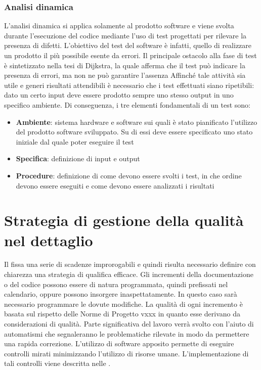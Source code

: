 \subsubsection{Analisi dinamica}

L'analisi dinamica si applica solamente al prodotto software e viene
svolta durante l'esecuzione del codice mediante l'uso di test
progettati per rilevare la presenza di difetti.
L'obiettivo del test del software è infatti, quello di
realizzare un prodotto il più possibile esente da errori. Il
principale ostacolo alla fase di test è sintetizzato nella tesi di
Dijkstra, la quale afferma che il test può indicare la presenza di
errori, ma non ne può garantire l'assenza
Affinché tale attività sia utile e generi risultati attendibili è
necessario che i test effettuati siano ripetibili: dato un certo input
deve essere prodotto sempre uno stesso output in uno specifico
ambiente. Di conseguenza, i tre elementi fondamentali di un test sono:

\begin{itemize}
\item \textbf{Ambiente}: sistema hardware e software sui quali è stato
  pianificato l'utilizzo del prodotto software sviluppato. Su di essi
  deve essere specificato uno stato iniziale dal quale poter eseguire
  il test

\item \textbf{Specifica}: definizione di input e output
\item \textbf{Procedure}: definizione di come devono essere svolti i
  test, in che ordine devono essere eseguiti e come devono essere
  analizzati i risultati
\end{itemize}




\section[Visione di dettaglio della qualità]{Strategia di gestione
  della qualità nel dettaglio}

Il \pianodiprogetto fissa una serie di scadenze improrogabili e quindi risulta necessario definire
con chiarezza una strategia di qualifica efficace. Gli incrementi della documentazione o del codice
possono essere di natura programmata, quindi prefissati nel calendario, oppure possono insorgere
inaspettatamente. In questo caso sarà necessario programmare le dovute
modifiche.
La qualità di ogni incremento è basata sul rispetto delle Norme di
Progetto vxxx in quanto esse derivano da considerazioni di qualità.
Parte significativa del lavoro
verrà svolto con l'aiuto di automatismi che segnaleranno le problematiche rilevate in modo da
permettere una rapida correzione. L’utilizzo di software apposito permette di eseguire controlli
mirati minimizzando l'utilizzo di risorse umane. L'implementazione di tali controlli viene descritta nelle
\normediprogetto .



